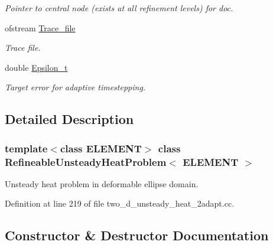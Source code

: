 \begin{DoxyCompactItemize}
\begin{DoxyCompactList}\small\item\em Pointer to central node (exists at all refinement levels) for doc. \end{DoxyCompactList}\item 
ofstream \hyperlink{classRefineableUnsteadyHeatProblem_a8f62ba78fb856d2e07b00254ca7a0e6a}{Trace\+\_\+file}
\begin{DoxyCompactList}\small\item\em Trace file. \end{DoxyCompactList}\item 
double \hyperlink{classRefineableUnsteadyHeatProblem_a362673bcb46e93a27e3603fd228bd3d7}{Epsilon\+\_\+t}
\begin{DoxyCompactList}\small\item\em Target error for adaptive timestepping. \end{DoxyCompactList}\end{DoxyCompactItemize}


\subsection{Detailed Description}
\subsubsection*{template$<$class E\+L\+E\+M\+E\+NT$>$\newline
class Refineable\+Unsteady\+Heat\+Problem$<$ E\+L\+E\+M\+E\+N\+T $>$}

Unsteady heat problem in deformable ellipse domain. 

Definition at line 219 of file two\+\_\+d\+\_\+unsteady\+\_\+heat\+\_\+2adapt.\+cc.



\subsection{Constructor \& Destructor Documentation}
\mbox{\label{classRefineableUnsteadyHeatProblem_a894f3bd6c1c23c307a736de6898e4e98}} 
